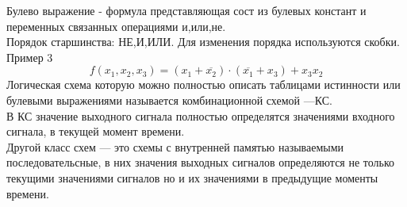 Булево выражение - формула представляющая сост из булевых констант и переменных связанных операциями и,или,не.\\
Порядок старшинства: НЕ,И,ИЛИ. Для изменения порядка используются скобки.\\
Пример 3
$$f(x_1 ,x_2 ,x_3)= (x_1 + \overline{x_2}) \cdot (\overline{x_1} + x_3) + x_3 x_2 $$
Логическая схема которую можно полностью описать таблицами истинности или булевыми выражениями называется комбинационной схемой —КС.\\
В КС значение выходного сигнала полностью определятся значениями входного сигнала, в текущей момент времени.\\
Другой класс схем — это схемы с внутренней памятью называемыми последовательсные, в них значения выходных сигналов определяются не только текущими значениями сигналов но и их значениями в предыдущие моменты времени.\\
